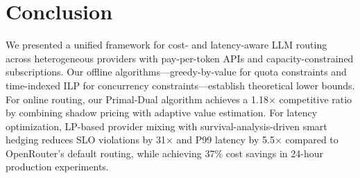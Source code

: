 \section{Conclusion}
\label{sec:conclusion}

We presented a unified framework for cost- and latency-aware LLM routing across heterogeneous providers with pay-per-token APIs and capacity-constrained subscriptions. Our offline algorithms---greedy-by-value for quota constraints and time-indexed ILP for concurrency constraints---establish theoretical lower bounds. For online routing, our Primal-Dual algorithm achieves a 1.18$\times$ competitive ratio by combining shadow pricing with adaptive value estimation. For latency optimization, LP-based provider mixing with survival-analysis-driven smart hedging reduces SLO violations by 31$\times$ and P99 latency by 5.5$\times$ compared to OpenRouter's default routing, while achieving 37\% cost savings in 24-hour production experiments.
